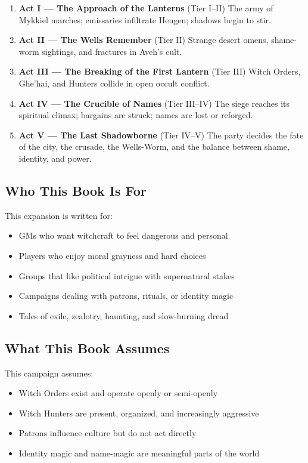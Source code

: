 \documentclass[11pt]{book}
\begin{document}
\begin{enumerate}[leftmargin=*]
    \item \textbf{Act I --- The Approach of the Lanterns} (Tier I--II)  
    The army of Mykkiel marches; emissaries infiltrate Heugen; shadows begin to stir.

    \item \textbf{Act II --- The Wells Remember} (Tier II)  
    Strange desert omens, shame-worm sightings, and fractures in Aveh's cult.

    \item \textbf{Act III --- The Breaking of the First Lantern} (Tier III)  
    Witch Orders, Ghe'hai, and Hunters collide in open occult conflict.

    \item \textbf{Act IV --- The Crucible of Names} (Tier III--IV)  
    The siege reaches its spiritual climax; bargains are struck; names are lost or reforged.

    \item \textbf{Act V --- The Last Shadowborne} (Tier IV--V)  
    The party decides the fate of the city, the crusade, the Wells-Worm,  
    and the balance between shame, identity, and power.
\end{enumerate}

\subsection{Who This Book Is For}
This expansion is written for:

\begin{itemize}[leftmargin=*]
    \item GMs who want witchcraft to feel dangerous and personal  
    \item Players who enjoy moral grayness and hard choices  
    \item Groups that like political intrigue with supernatural stakes  
    \item Campaigns dealing with patrons, rituals, or identity magic  
    \item Tales of exile, zealotry, haunting, and slow-burning dread  
\end{itemize}

\subsection{What This Book Assumes}
This campaign assumes:

\begin{itemize}[leftmargin=*]
    \item Witch Orders exist and operate openly or semi-openly  
    \item Witch Hunters are present, organized, and increasingly aggressive  
    \item Patrons influence culture but do not act directly  
    \item Identity magic and name-magic are meaningful parts of the world  
\end{itemize}
\end{document}
